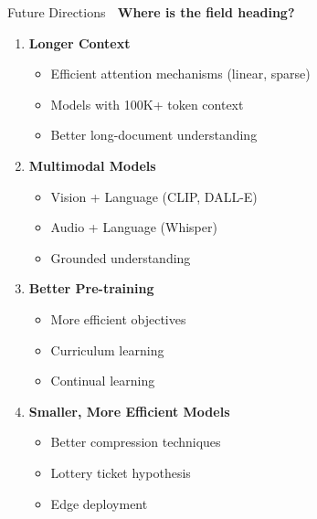 \documentclass[aspectratio=169]{beamer}
\begin{document}
\begin{frame}[shrink=10]{Future Directions 🔮}
\textbf{Where is the field heading?}

\vspace{1em}

\begin{enumerate}\setlength{\itemsep}{0pt}
    \item \textbf{Longer Context}
    \begin{itemize}\setlength{\itemsep}{0pt}
        \item Efficient attention mechanisms (linear, sparse)
        \item Models with 100K+ token context
        \item Better long-document understanding
    \end{itemize}

    \vspace{0.5em}

    \item \textbf{Multimodal Models}
    \begin{itemize}\setlength{\itemsep}{0pt}
        \item Vision + Language (CLIP, DALL-E)
        \item Audio + Language (Whisper)
        \item Grounded understanding
    \end{itemize}

    \vspace{0.5em}

    \item \textbf{Better Pre-training}
    \begin{itemize}\setlength{\itemsep}{0pt}
        \item More efficient objectives
        \item Curriculum learning
        \item Continual learning
    \end{itemize}

    \vspace{0.5em}

    \item \textbf{Smaller, More Efficient Models}
    \begin{itemize}\setlength{\itemsep}{0pt}
        \item Better compression techniques
        \item Lottery ticket hypothesis
        \item Edge deployment
    \end{itemize}


\end{enumerate}
\end{frame}
\end{document}

